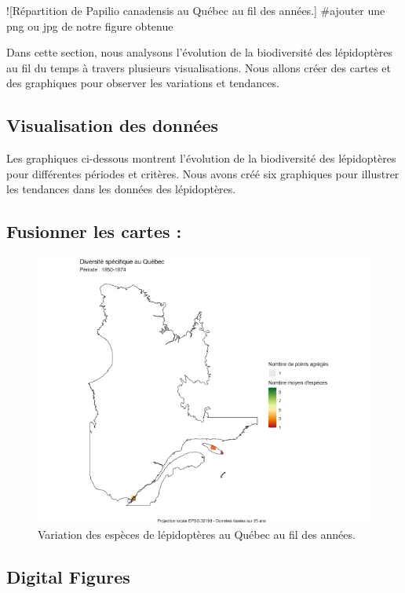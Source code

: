 \documentclass[9pt,twocolumn,twoside,]{pnas-new}
\begin{document}
!{[}Répartition de Papilio canadensis au Québec au fil des années.{}{]}
\#ajouter une png ou jpg de notre figure obtenue

Dans cette section, nous analysons l'évolution de la biodiversité des
lépidoptères au fil du temps à travers plusieurs visualisations. Nous
allons créer des cartes et des graphiques pour observer les variations
et tendances.

\subsection{Visualisation des
données}\label{visualisation-des-donnuxe9es}

Les graphiques ci-dessous montrent l'évolution de la biodiversité des
lépidoptères pour différentes périodes et critères. Nous avons créé six
graphiques pour illustrer les tendances dans les données des
lépidoptères.

\subsection{Fusionner les cartes :}\label{fusionner-les-cartes}

\begin{figure}
\centering
\includegraphics{carte_1850-1874.png}
\caption{Variation des espèces de lépidoptères au Québec au fil des
années.{}}
\end{figure}

\subsection*{Digital Figures}\label{sec:figures}
\end{document}
